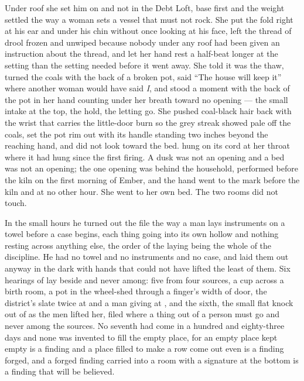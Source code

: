 Under  roof she set him on  and not in the Debt Loft, base first and the weight settled the way a woman sets a vessel that must not rock. She put the fold right at his ear and under his chin without once looking at his face, left the thread of drool frozen and unwiped because nobody under any roof had been given an instruction about the thread, and let her hand rest a half-beat longer at the setting than the setting needed before it went away. She told  it was the thaw, turned the coals with the back of a broken pot, said “The house will keep it” where another woman would have said \emph{I}, and stood a moment with the back of the pot in her hand counting under her breath toward no opening — the small intake at the top, the hold, the letting go. She pushed coal-black hair back with the wrist that carries the little-door burn so the grey streak showed pale off the coals, set the pot rim out with its handle standing two inches beyond the reaching hand, and did not look toward the bed.  hung on its cord at her throat where it had hung since the first firing. A dusk was not an opening and a bed was not an opening; the one opening was behind the household, performed before the kiln on the first morning of Ember, and the hand went to the mark before the kiln and at no other hour. She went to her own bed. The two rooms did not touch.

\scenebreak

In the small hours he turned out the file the way a man lays instruments on a towel before a case begins, each thing going into its own hollow and nothing resting across anything else, the order of the laying being the whole of the discipline. He had no towel and no instruments and no case, and laid them out anyway in the dark with hands that could not have lifted the least of them. Six hearings of  lay beside and never among: five from four sources, a cup across a birth room, a pot in the wheel-shed through a finger's width of door, the district's slate twice at  and a man giving at , and the sixth, the small flat knock out of  as the men lifted her, filed where a thing out of a person must go and never among the sources. No seventh had come in a hundred and eighty-three days and none was invented to fill the empty place, for an empty place kept empty is a finding and a place filled to make a row come out even is a finding forged, and a forged finding carried into a room with a signature at the bottom is a finding that will be believed.

